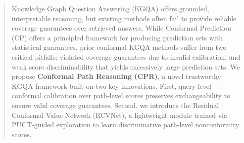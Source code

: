 \documentclass{article}
\theoremstyle{plain}
\theoremstyle{definition}
\theoremstyle{remark}
\begin{document}
% 
% 
% 
% 
% 
% 
% 


\begin{abstract}
Knowledge Graph Question Answering (KGQA) offers grounded, interpretable reasoning, but existing methods often fail to provide reliable coverage guarantees over retrieved answers. 
While Conformal Prediction (CP) offers a principled framework for producing prediction sets with statistical guarantees, prior conformal KGQA methods suffer from two critical pitfalls:  %
violated coverage guarantees due to invalid calibration, and weak score discriminability that yields excessively large prediction sets. We propose \textbf{Conformal Path Reasoning (CPR)}\footnotemark, a novel trustworthy KGQA framework built on two key innovations. First, query-level conformal calibration over path-level scores preserves exchangeability to ensure valid coverage guarantees. %
Second, we introduce the Residual Conformal Value Network (RCVNet), a lightweight module trained via PUCT-guided exploration to learn discriminative path-level nonconformity scores. 

\end{abstract}
\end{document}
